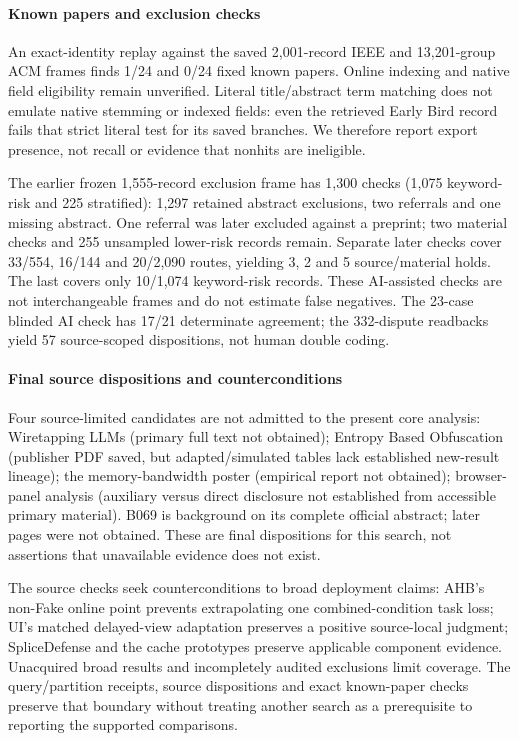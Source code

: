 \paragraph{Known papers and exclusion checks}
An exact-identity replay against the saved 2,001-record IEEE and 13,201-group ACM frames finds 1/24 and 0/24 fixed known papers. Online indexing and native field eligibility remain unverified. Literal title/abstract term matching does not emulate native stemming or indexed fields: even the retrieved Early Bird record fails that strict literal test for its saved branches. We therefore report export presence, not recall or evidence that nonhits are ineligible.

The earlier frozen 1,555-record exclusion frame has 1,300 checks (1,075 keyword-risk and 225 stratified): 1,297 retained abstract exclusions, two referrals and one missing abstract. One referral was later excluded against a preprint; two material checks and 255 unsampled lower-risk records remain. Separate later checks cover 33/554, 16/144 and 20/2,090 routes, yielding 3, 2 and 5 source/material holds. The last covers only 10/1,074 keyword-risk records. These AI-assisted checks are not interchangeable frames and do not estimate false negatives. The 23-case blinded AI check has 17/21 determinate agreement; the 332-dispute readbacks yield 57 source-scoped dispositions, not human double coding.

\paragraph{Final source dispositions and counterconditions}
Four source-limited candidates are not admitted to the present core analysis: Wiretapping LLMs (primary full text not obtained); Entropy Based Obfuscation (publisher PDF saved, but adapted/simulated tables lack established new-result lineage); the memory-bandwidth poster (empirical report not obtained); browser-panel analysis (auxiliary versus direct disclosure not established from accessible primary material). B069 is background on its complete official abstract; later pages were not obtained. These are final dispositions for this search, not assertions that unavailable evidence does not exist.

The source checks seek counterconditions to broad deployment claims: AHB's non-Fake online point prevents extrapolating one combined-condition task loss; UI's matched delayed-view adaptation preserves a positive source-local judgment; SpliceDefense and the cache prototypes preserve applicable component evidence. Unacquired broad results and incompletely audited exclusions limit coverage. The query/partition receipts, source dispositions and exact known-paper checks preserve that boundary without treating another search as a prerequisite to reporting the supported comparisons.
